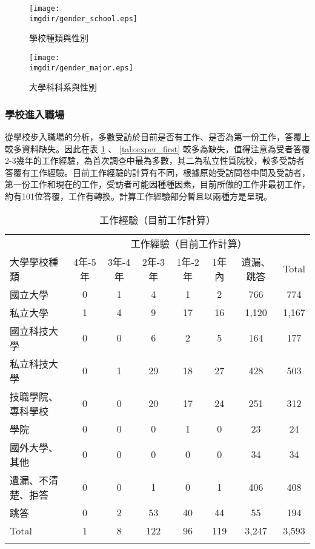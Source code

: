 \documentclass[12pt, a4paper]{article}
\begin{document}
\begin{figure}[H]
    \centering    
        \texttt{[image: \\imgdir/gender\_school.eps]}
        \caption{學校種類與性別}
        \label{pic:shcool_gender}
\end{figure}

\begin{figure}[H]
    \centering    
        \texttt{[image: \\imgdir/gender\_major.eps]}
        \caption{大學科科系與性別}
        \label{pic:major_gender}
\end{figure}




\clearpage
\subsubsection{學校進入職場}

從學校步入職場的分析，多數受訪於目前是否有工作、是否為第一份工作，答覆上較多資料缺失。因此在表 \ref{tab:exper_curret} 、 \ref{tab:exper_first} 較多為缺失，值得注意為受者答覆2-3幾年的工作經驗，為首次調查中最為多數，其二為私立性質院校，較多受訪者答覆有工作經驗。目前工作經驗的計算有不同，根據原始受訪問卷中問及受訪者，第一份工作和現在的工作，受訪者可能因種種因素，目前所做的工作非最初工作，約有101位答覆，工作有轉換。計算工作經驗部分暫且以兩種方是呈現。



\begin{table}[ht]
\centering
\renewcommand{\arraystretch}{1.3} %
\extrarowheight=5pt
\caption{工作經驗（目前工作計算）}
\begin{adjustbox}{width=\textwidth}
\begin{tabular}{l*{7}{c}}
\toprule
& \multicolumn{7}{c}{工作經驗（目前工作計算）} \\
\cmidrule(lr){2-8}
\multirow{2}{*}{大學學校種類} & \multirow{2}{*}{4年-5年} & \multirow{2}{*}{3年-4年} & \multirow{2}{*}{2年-3年} & \multirow{2}{*}{1年-2年} & \multirow{2}{*}{1年內} & \multirow{2}{*}{遺漏、跳答} & \multirow{2}{*}{Total} \\
&  &  & &  & &、不清楚、跳答 &  \\
\midrule
國立大學 & 0 & 1 & 4 & 1 & 2 & 766 & 774 \\
私立大學 & 1 & 4 & 9 & 17 & 16 & 1,120 & 1,167 \\
國立科技大學 & 0 & 0 & 6 & 2 & 5 & 164 & 177 \\
私立科技大學 & 0 & 1 & 29 & 18 & 27 & 428 & 503 \\
技職學院、專科學校 & 0 & 0 & 20 & 17 & 24 & 251 & 312 \\
學院 & 0 & 0 & 0 & 1 & 0 & 23 & 24 \\
國外大學、其他 & 0 & 0 & 0 & 0 & 0 & 34 & 34 \\
遺漏、不清楚、拒答 & 0 & 0 & 1 & 0 & 1 & 406 & 408 \\
跳答 & 0 & 2 & 53 & 40 & 44 & 55 & 194 \\
Total & 1 & 8 & 122 & 96 & 119 & 3,247 & 3,593 \\
\bottomrule
\label{tab:exper_curret}
\end{tabular}
\end{adjustbox}
\end{table}
\end{document}
